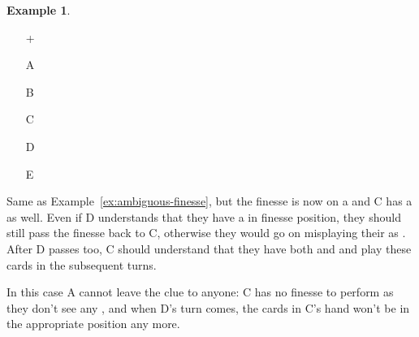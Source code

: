 \documentclass[a4paper]{article}
\theoremstyle{plain}
\theoremstyle{definition}
\newtheorem{example}[theorem]{Example}
\begin{document}
\begin{example}	\hfill \\
	\begin{minipage}{0.45\textwidth}
		\begin{itemize}
			\item[\Large +]      
			\item[\Large A]    
			\item[\Large B]    
			\item[\Large C]     
			\item[\Large D]    
			\item[\Large E]    
		\end{itemize}
	\end{minipage}%
	\begin{minipage}{0.55\textwidth}
		Same as Example~\ref{ex:ambiguous-finesse}, but the finesse is now on a  and C has a  as well. Even if D understands that they have a  in finesse position, they should still pass the finesse back to C, otherwise they would go on misplaying their  as . After D passes too, C should understand that they have both  and  and play these cards in the subsequent turns.
		
		In this case A cannot leave the clue to anyone: C has no finesse to perform as they don't see any , and when D's turn comes, the cards in C's hand won't be in the appropriate position any more.
	\end{minipage}
\end{example} \vspace{0.15 cm}
\end{document}
